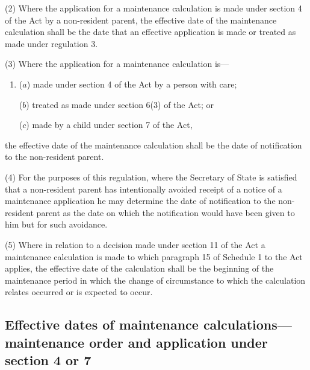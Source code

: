 \documentclass[12pt,a4paper]{article}
\begin{document}
(2) Where the application for a maintenance calculation is made under section 4 of the Act by a non-resident parent, the effective date of the maintenance calculation shall be the date that an effective application is made or treated as made under regulation 3.

(3) Where the application for a maintenance calculation is—
\begin{enumerate}\item[]
($a$) made under section 4 of the Act by a person with care;

($b$) treated as made under section 6(3) of the Act; or

($c$) made by a child under section 7 of the Act,
\end{enumerate}
the effective date of the maintenance calculation shall be the date of notification to the non-resident parent.

(4) For the purposes of this regulation, where the Secretary of State is satisfied that a non-resident parent has intentionally avoided receipt of a notice of a maintenance application he may determine the date of notification to the non-resident parent as the date on which the notification would have been given to him but for such avoidance.

(5) Where in relation to a decision made under section 11 of the Act a maintenance calculation is made to which paragraph 15 of Schedule 1 to the Act applies, the effective date of the calculation shall be the beginning of the maintenance period in which the change of circumstance to which the calculation relates occurred or is expected to occur.


\subsection[26. Effective dates of maintenance calculations—maintenance order and application under section 4 or 7]{Effective dates of maintenance calculations—maintenance order and application under section 4 or 7}
\end{document}

